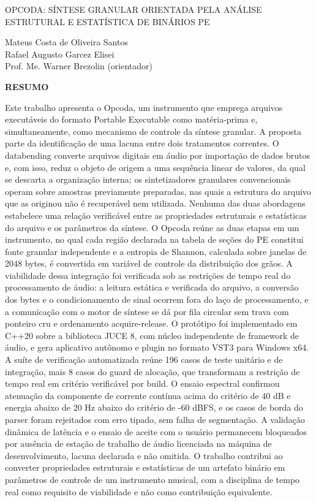 \documentclass[12pt,a4paper]{article}
\begin{document}
\begin{center}\MakeUppercase{Opcoda: s\'intese granular orientada pela an\'alise estrutural e estat\'istica de bin\'arios PE}\end{center}

\begin{flushright}Mateus Costa de Oliveira Santos\\[0.4em]Rafael Augusto Garcez Elisei\\[0.4em]Prof. Me. Warner Brezolin (orientador)\par\end{flushright}

{\small

\noindent\textbf{RESUMO}\par\vspace{2pt}
\noindent Este trabalho apresenta o Opcoda, um instrumento que emprega arquivos executáveis do formato Portable Executable como matéria-prima e, simultaneamente, como mecanismo de controle da síntese granular. A proposta parte da identificação de uma lacuna entre dois tratamentos correntes. O databending converte arquivos digitais em áudio por importação de dados brutos e, com isso, reduz o objeto de origem a uma sequência linear de valores, da qual se descarta a organização interna; os sintetizadores granulares convencionais operam sobre amostras previamente preparadas, nas quais a estrutura do arquivo que as originou não é recuperável nem utilizada. Nenhuma das duas abordagens estabelece uma relação verificável entre as propriedades estruturais e estatísticas do arquivo e os parâmetros da síntese. O Opcoda reúne as duas etapas em um instrumento, no qual cada região declarada na tabela de seções do PE constitui fonte granular independente e a entropia de Shannon, calculada sobre janelas de 2048 bytes, é convertida em variável de controle da distribuição dos grãos. A viabilidade dessa integração foi verificada sob as restrições de tempo real do processamento de áudio: a leitura estática e verificada do arquivo, a conversão dos bytes e o condicionamento de sinal ocorrem fora do laço de processamento, e a comunicação com o motor de síntese se dá por fila circular sem trava com ponteiro cru e ordenamento acquire-release. O protótipo foi implementado em C++20 sobre a biblioteca JUCE 8, com núcleo independente de framework de áudio, e gera aplicativo autônomo e plugin no formato VST3 para Windows x64. A suíte de verificação automatizada reúne 196 casos de teste unitário e de integração, mais 8 casos do guard de alocação, que transformam a restrição de tempo real em critério verificável por build. O ensaio espectral confirmou atenuação da componente de corrente contínua acima do critério de 40 dB e energia abaixo de 20 Hz abaixo do critério de -60 dBFS, e os casos de borda do parser foram rejeitados com erro tipado, sem falha de segmentação. A validação dinâmica de latência e o ensaio de aceite com o usuário permanecem bloqueados por ausência de estação de trabalho de áudio licenciada na máquina de desenvolvimento, lacuna declarada e não omitida. O trabalho contribui ao converter propriedades estruturais e estatísticas de um artefato binário em parâmetros de controle de um instrumento musical, com a disciplina de tempo real como requisito de viabilidade e não como contribuição equivalente.\par
}
\end{document}
